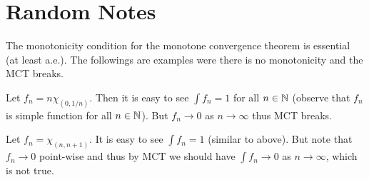 \chapter{Random Notes}

\begin{observation}
	The monotonicity condition for the monotone convergence theorem is essential (at least a.e.). The followings are examples were there is no monotonicity and the MCT breaks.
	\begin{example}
		Let $ f_n = n\chi_{(0,1/n)} $. Then it is easy to see $ \int f_n = 1 $ for all $ n\in \mathbb{N} $ (observe that $ f_n $ is simple function for all $ n\in \mathbb{N} $). But $ f_n \to 0 $ as $ n\to\infty $ thus MCT breaks.
	\end{example} 
	\begin{example}
		Let $ f_n = \chi_{(n,n+1)} $. It is easy to see $ \int f_n = 1 $ (similar to above). But note that $ f_n \to 0 $ point-wise and thus by MCT we should have $ \int f_n \to 0 $ as $ n\to \infty $, which is not true. 
	\end{example}
\end{observation}